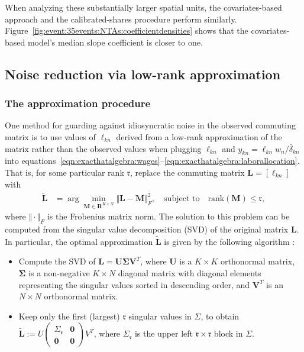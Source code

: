 \documentclass[11pt]{article}
\theoremstyle{definition}
\begin{document}
When analyzing these substantially larger spatial units,
the covariates-based approach and the calibrated-shares procedure perform similarly.
Figure~\ref{fig:event:35events:NTAs:coefficientdensities} shows that
the covariates-based model's median slope coefficient is closer to one.


\subsection{Noise reduction via low-rank approximation}\label{sec:appendix:svd}

\subsubsection{The approximation procedure}

One method for guarding against idiosyncratic noise in the observed commuting matrix is to
use values of $\ell_{kn}$ derived from a low-rank approximation of the matrix 
rather than the observed values
when plugging $\ell_{kn}$ and $y_{kn} = \ell_{kn} w_n / \bar{\delta}_{kn}$ into equations~\eqref{eqn:exacthatalgebra:wages}--\eqref{eqn:exacthatalgebra:laborallocation}.
That is, for some particular rank \(\mathfrak{r}\), replace the commuting matrix \(\mathbf{L} =\left[\ell_{kn}\right]\) with
\begin{equation}
\label{eqn:svd:approximation}
\begin{split}
\tilde{\mathbf{L}} &= \operatorname*{arg} \min_{\mathbf{M}\in\mathbf{R}^{K\times N}} \Vert \mathbf{L} - \mathbf{M}\Vert^{2}_{F}, \quad \text{subject to} \quad \text{rank}(\mathbf{M}) \leq \mathfrak{r},
\end{split}
\end{equation}
where \(\Vert \cdot \Vert_F\) is the Frobenius matrix norm.
The solution to this problem can be computed from the singular value decomposition (SVD) of the original matrix \(\mathbf{L}\).
In particular, the optimal approximation \(\tilde{\mathbf{L}}\) is given by the following algorithm :
\begin{itemize}
    \item Compute the SVD of $\mathbf{L}=\mathbf{U}\mathbf{\Sigma}\mathbf{V}^{T}$, 
    where $\mathbf{U}$ is a $K \times K$ orthonormal matrix, 
    $\mathbf{\Sigma}$ is a non-negative $K \times N$ diagonal matrix with diagonal elements representing 
    the singular values sorted in descending order,
    and $\mathbf{V}^{T}$ is an $N \times N$ orthonormal matrix.
   
   
   
    \item Keep only the first (largest) \(\mathfrak{r}\) singular values in \(\Sigma\), to obtain
    \(\tilde{\mathbf{L}} := U \begin{pmatrix}\Sigma_{\mathfrak{r}} & \mathbf{0}\\ \mathbf{0} & \mathbf{0}\end{pmatrix} V^T\),
    where \(\Sigma_{\mathfrak{r}}\) is the upper left \(\mathfrak{r} \times \mathfrak{r}\) block in \(\Sigma\).
\end{itemize}
\end{document}
